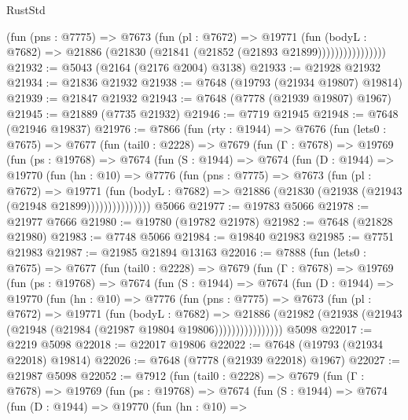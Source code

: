 \begin{lexlean}{RustStd}
\begin{coremodule}
{\begin{coremodule}
{{{{{{{{{{{{{{{{{{{{{{{{{{{{{{{{{{{{{{{{{{{{{{{{{{{{{                      (fun (pns : @7775) =>
                      @7673
                        (fun (pl : @7672) =>
                        @19771
                          (fun (bodyL : @7682) =>
                          @21886 (@21830 (@21841 (@21852 (@21893 @21899))))))))))))))))
@21932 := @5043 (@2164 (@2176 @2004) @3138)
@21933 := @21928 @21932
@21934 := @21836 @21932
@21938 := @7648 (@19793 (@21934 @19807) @19814)
@21939 := @21847 @21932
@21943 := @7648 (@7778 (@21939 @19807) @1967)
@21945 := @21889 (@7735 @21932)
@21946 := @7719 @21945
@21948 := @7648 (@21946 @19837)
@21976 := @7866
    (fun (rty : @1944) =>
    @7676
      (fun (lets0 : @7675) =>
      @7677
        (fun (tail0 : @2228) =>
        @7679
          (fun (Γ : @7678) =>
          @19769
            (fun (ps : @19768) =>
            @7674
              (fun (S : @1944) =>
              @7674
                (fun (D : @1944) =>
                @19770
                  (fun (hn : @10) =>
                  @7776
                    (fun (pns : @7775) =>
                    @7673
                      (fun (pl : @7672) =>
                      @19771
                        (fun (bodyL : @7682) =>
                        @21886 (@21830 (@21938 (@21943 (@21948 @21899)))))))))))))))
    @5066
@21977 := @19783 @5066
@21978 := @21977 @7666
@21980 := @19780 (@19782 @21978)
@21982 := @7648 (@21828 @21980)
@21983 := @7748 @5066
@21984 := @19840 @21983
@21985 := @7751 @21983
@21987 := @21985 @21894 @13163
@22016 := @7888
    (fun (lets0 : @7675) =>
    @7677
      (fun (tail0 : @2228) =>
      @7679
        (fun (Γ : @7678) =>
        @19769
          (fun (ps : @19768) =>
          @7674
            (fun (S : @1944) =>
            @7674
              (fun (D : @1944) =>
              @19770
                (fun (hn : @10) =>
                @7776
                  (fun (pns : @7775) =>
                  @7673
                    (fun (pl : @7672) =>
                    @19771
                      (fun (bodyL : @7682) =>
                      @21886
                        (@21982
                          (@21938 (@21943 (@21948 (@21984 (@21987 @19804 @19806))))))))))))))))
    @5098
@22017 := @2219 @5098
@22018 := @22017 @19806
@22022 := @7648 (@19793 (@21934 @22018) @19814)
@22026 := @7648 (@7778 (@21939 @22018) @1967)
@22027 := @21987 @5098
@22052 := @7912
    (fun (tail0 : @2228) =>
    @7679
      (fun (Γ : @7678) =>
      @19769
        (fun (ps : @19768) =>
        @7674
          (fun (S : @1944) =>
          @7674
            (fun (D : @1944) =>
            @19770
              (fun (hn : @10) =>
}}}}}}}}}}}}}}}}}}}}}}}}}}}}}}}}}}}}}}}}}}}}}}}}}}}}}
\end{coremodule}}
\end{coremodule}
\end{lexlean}
